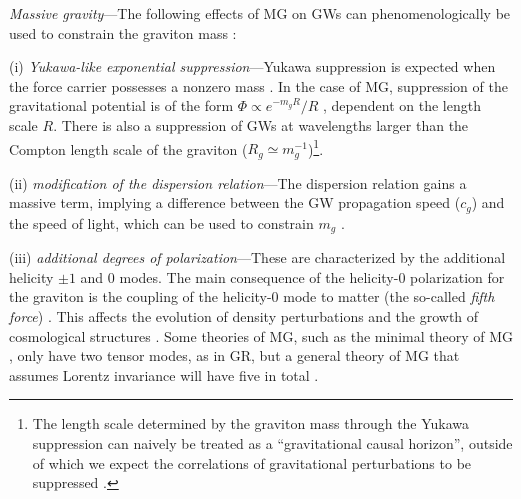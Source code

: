 \documentclass[10pt,prd,twocolumn,aps,nofootinbib,nobibnotes,superscriptaddress,preprintnumbers]{revtex4-2}
\begin{document}
\textit{Massive gravity}---The following effects of MG on GWs can phenomenologically be used to constrain the graviton mass \cite{deRham:2016nuf}:

(i) \textit{Yukawa-like exponential suppression}---Yukawa suppression is expected when the force carrier possesses a nonzero mass \cite{Will:1997bb}. In the case of MG, suppression of the gravitational potential is of the form $\Phi \propto e^{-m_gR}/R$ \cite{Will:1997bb}, dependent on the length scale $R$. There is also a suppression of GWs at wavelengths larger than the Compton length scale of the graviton ($R_g \simeq m_g^{-1}$)\footnote{The length scale determined by the graviton mass through the Yukawa suppression can naively be treated as a ``gravitational causal horizon'', outside of which we expect the correlations of gravitational perturbations to be suppressed \cite{Will:1997bb}.}.

(ii) \textit{modification of the dispersion relation}---The dispersion relation gains a massive term, implying a difference between the GW propagation speed ($c_g$) and the speed of light, which can be used to constrain $m_g$ \cite{LIGOScientific:2017vwq, LIGOScientific:2017zic, LIGOScientific:2017ync}. 

(iii) \textit{additional degrees of polarization}---These are characterized by the additional helicity $\pm 1$ and $0$ modes. The main consequence of the helicity-$0$ polarization for the graviton is the coupling of the helicity-0 mode to matter (the so-called {\it fifth force}) \cite{deRham:2014naa}. This affects the evolution of density perturbations and the growth of cosmological structures \cite{Sipp:2022kmb}. Some theories of MG, such as the minimal theory of MG \cite{DeFelice:2015hla}, only have two tensor modes, as in GR, but a general theory of MG that assumes Lorentz invariance will have five in total \cite{Comelli:2013tja}.
\end{document}
